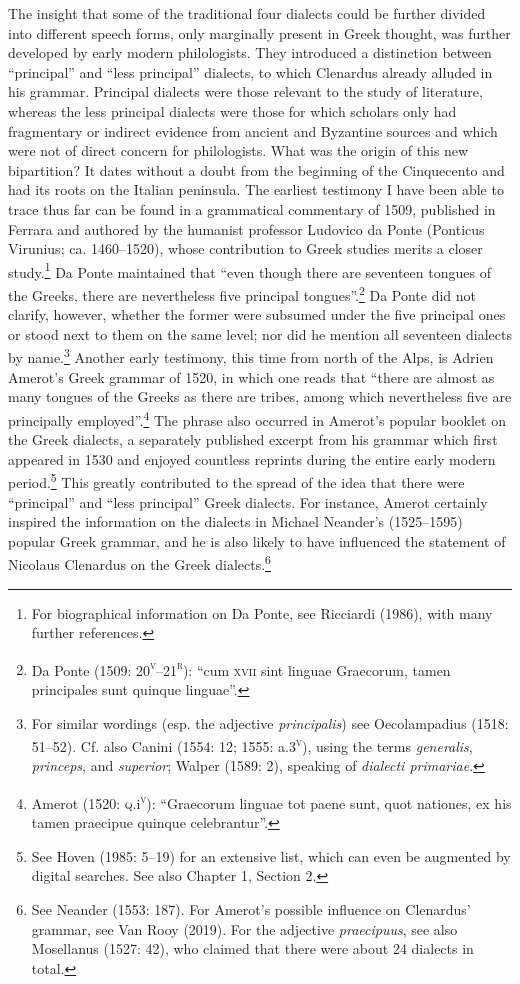 \documentclass[12pt]{article}
\newenvironment{styleStandard}{\renewcommand\baselinestretch{1.25}\setlength\leftskip{0in}\setlength\rightskip{0in}\setlength\parindent{0.1972in}\setlength\parfillskip{0pt plus 1fil}\setlength\parskip{0in plus 1pt}\writerlistparindent\writerlistleftskip\leavevmode\normalfont\normalsize\writerlistlabel\ignorespaces}{\unskip\vspace{0in plus 1pt}\par}
\newcommand\writerlistleftskip{}
\newcommand\writerlistparindent{}
\newcommand\writerlistlabel{}
\begin{document}
\begin{styleStandard}
The insight that some of the traditional four dialects could be further divided into different speech forms, only marginally present in Greek thought, was further developed by early modern philologists. They introduced a distinction between “principal” and “less principal” dialects, to which Clenardus already alluded in his grammar. Principal dialects were those relevant to the study of literature, whereas the less principal dialects were those for which scholars only had fragmentary or indirect evidence from ancient and Byzantine sources and which were not of direct concern for philologists. What was the origin of this new bipartition? It dates without a doubt from the beginning of the Cinquecento and had its roots on the Italian peninsula. The earliest testimony I have been able to trace thus far can be found in a grammatical commentary of 1509, published in Ferrara and authored by the humanist professor Ludovico da Ponte (Ponticus Virunius; ca. 1460–1520), whose contribution to Greek studies merits a closer study.\footnote{ For biographical information on Da Ponte, see Ricciardi (1986), with many further references.} Da Ponte maintained that “even though there are seventeen tongues of the Greeks, there are nevertheless five principal tongues”.\footnote{ Da Ponte (1509: 20\textsc{\textsuperscript{v}}–21\textsc{\textsuperscript{r}}): “cum \textsc{xvii} sint linguae Graecorum, tamen principales sunt quinque linguae”.} Da Ponte did not clarify, however, whether the former were subsumed under the five principal ones or stood next to them on the same level; nor did he mention all seventeen dialects by name.\footnote{ For similar wordings (esp. the adjective \textit{principalis}) see Oecolampadius (1518: 51–52). Cf. also Canini (1554: 12; 1555: a.3\textsc{\textsuperscript{v}}), using the terms \textit{generalis}, \textit{princeps}, and \textit{superior}; Walper (1589: 2), speaking of \textit{dialecti primariae}.} Another early testimony, this time from north of the Alps, is Adrien Amerot’s Greek grammar of 1520, in which one reads that “there are almost as many tongues of the Greeks as there are tribes, among which nevertheless five are principally employed”.\footnote{ Amerot (1520: \textsc{q}.i\textsc{\textsuperscript{v}}\textsc{)}: “Graecorum linguae tot paene sunt, quot nationes, ex his tamen praecipue quinque celebrantur”.} The phrase also occurred in Amerot’s popular booklet on the Greek dialects, a separately published excerpt from his grammar which first appeared in 1530 and enjoyed countless reprints during the entire early modern period.\footnote{ See Hoven (1985: 5–19) for an extensive list, which can even be augmented by digital searches. See also Chapter 1, Section 2.} This greatly contributed to the spread of the idea that there were “principal” and “less principal” Greek dialects. For instance, Amerot certainly inspired the information on the dialects in Michael Neander’s (1525–1595) popular Greek grammar, and he is also likely to have influenced the statement of Nicolaus Clenardus on the Greek dialects.\footnote{ See Neander (1553: 187). For Amerot’s possible influence on Clenardus’ grammar, see Van Rooy (2019). For the adjective \textit{praecipuus}, see also Mosellanus (1527: 42), who claimed that there were about 24 dialects in total.}

\end{styleStandard}
\end{document}
